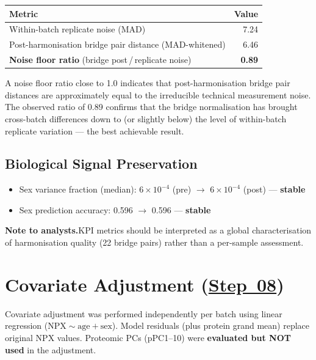 \documentclass[11pt,a4paper]{article}
\begin{document}
{\footnotesize
\renewcommand{\arraystretch}{1.2}
\begin{longtable}{p{7cm}r}
\toprule
\textbf{Metric} & \textbf{Value} \\
\midrule
Within-batch replicate noise (MAD) & 7.24 \\
Post-harmonisation bridge pair distance (MAD-whitened) & 6.46 \\
\textbf{Noise floor ratio} (bridge post\,/\,replicate noise) & \textbf{0.89} \\
\bottomrule
\end{longtable}
\renewcommand{\arraystretch}{1.0}
}

A noise floor ratio close to 1.0 indicates that post-harmonisation bridge
pair distances are approximately equal to the irreducible technical
measurement noise. The observed ratio of 0.89 confirms that the bridge
normalisation has brought cross-batch differences down to (or slightly below)
the level of within-batch replicate variation --- the best achievable result.

\subsection{Biological Signal Preservation}

\begin{itemize}
  \item Sex variance fraction (median): $6 \times 10^{-4}$ (pre)
        $\to$ $6 \times 10^{-4}$ (post) --- \textbf{stable}
  \item Sex prediction accuracy: 0.596 $\to$ 0.596 --- \textbf{stable}
\end{itemize}

\textbf{Note to analysts.}\enspace KPI metrics should be interpreted as a
global characterisation of harmonisation quality (22 bridge pairs) rather
than a per-sample assessment.

\section{Covariate Adjustment (\href{https://github.com/FINNGEN/FinnGen3-proteomics-pipeline#pipeline-steps}{Step~08})}

Covariate adjustment was performed independently per batch using linear
regression ($\text{NPX} \sim \text{age} + \text{sex}$). Model residuals
(plus protein grand mean) replace original NPX values. Proteomic PCs
(pPC1--10) were \textbf{evaluated but NOT used} in the adjustment.
\end{document}
